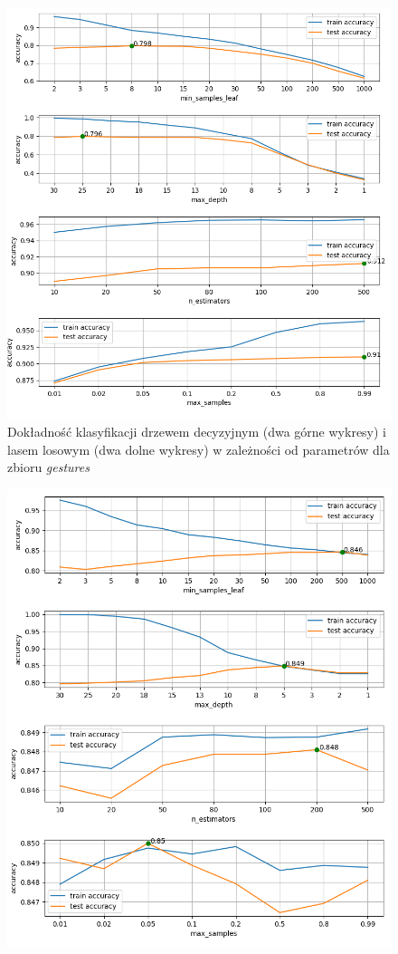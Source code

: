 \documentclass{classrep}
\begin{document}
{{\begin{figure}[h]
                \includegraphics[width=\textwidth]{img/mum_trees_2.png}
                \caption{Dokładność klasyfikacji drzewem decyzyjnym (dwa górne wykresy) i lasem losowym (dwa dolne wykresy) w zależności od parametrów dla zbioru \emph{gestures}}
                \label{trees_gestures}
            \end{figure}
            \begin{figure}[h]
                \centering
                \includegraphics[width=\textwidth]{img/mum_trees_3.png}

\end{figure}}}
\end{document}

